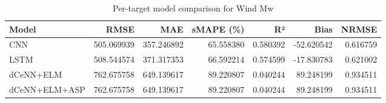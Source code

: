 \begin{table}
\caption{Per-target model comparison for Wind Mw}
\begin{tabular}{lrrrrrr}
\toprule
Model & RMSE & MAE & sMAPE (\%) & R² & Bias & NRMSE \\
\midrule
CNN & 505.069939 & 357.246892 & 65.558380 & 0.580392 & -52.620542 & 0.616759 \\
LSTM & 508.544574 & 371.317353 & 66.592214 & 0.574599 & -17.830783 & 0.621002 \\
dCeNN+ELM & 762.675758 & 649.139617 & 89.220807 & 0.040244 & 89.248199 & 0.934511 \\
dCeNN+ELM+ASP & 762.675758 & 649.139617 & 89.220807 & 0.040244 & 89.248199 & 0.934511 \\
\bottomrule
\end{tabular}
\end{table}
